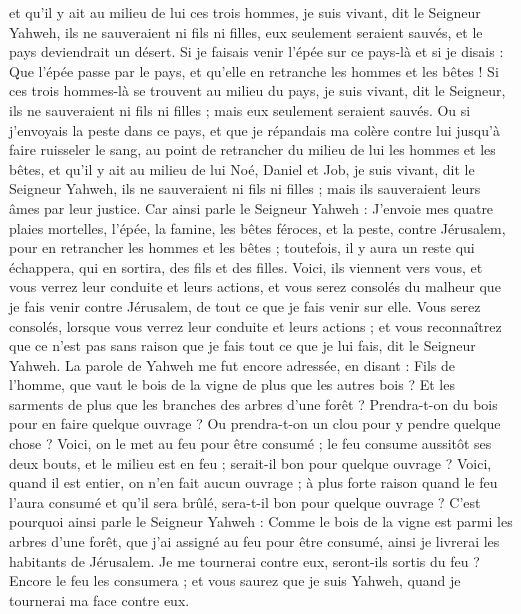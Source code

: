 \begin{multicols}{2}
et qu’il y ait au milieu de lui ces trois hommes, je suis vivant, dit le Seigneur Yahweh, ils ne sauveraient ni fils ni filles, eux seulement seraient sauvés, et le pays deviendrait un désert.
Si je faisais venir l'épée sur ce pays-là et si je disais : Que l'épée passe par le pays, et qu'elle en retranche les hommes et les bêtes !
Si ces trois hommes-là se trouvent au milieu du pays, je suis vivant, dit le Seigneur, ils ne sauveraient ni fils ni filles ; mais eux seulement seraient sauvés.
Ou si j'envoyais la peste dans ce pays, et que je répandais ma colère contre lui jusqu’à faire ruisseler le sang, au point de retrancher du milieu de lui les hommes et les bêtes,
et qu’il y ait au milieu de lui Noé, Daniel et Job, je suis vivant, dit le Seigneur Yahweh, ils ne sauveraient ni fils ni filles ; mais ils sauveraient leurs âmes par leur justice.
Car ainsi parle le Seigneur Yahweh : J'envoie mes quatre plaies mortelles, l'épée, la famine, les bêtes féroces, et la peste, contre Jérusalem, pour en retrancher les hommes et les bêtes ;
toutefois, il y aura un reste qui échappera, qui en sortira, des fils et des filles. Voici, ils viennent vers vous, et vous verrez leur conduite et leurs actions, et vous serez consolés du malheur que je fais venir contre Jérusalem, de tout ce que je fais venir sur elle.
Vous serez consolés, lorsque vous verrez leur conduite et leurs actions ; et vous reconnaîtrez que ce n’est pas sans raison que je fais tout ce que je lui fais, dit le Seigneur Yahweh.
\VerseOne{}La parole de Yahweh me fut encore adressée, en disant :
Fils de l’homme, que vaut le bois de la vigne de plus que les autres bois ? Et les sarments  de plus que les branches des arbres d'une forêt ?
Prendra-t-on du bois pour en faire quelque ouvrage ? Ou prendra-t-on un clou pour y pendre quelque chose ?
Voici, on le met au feu pour être consumé ; le feu consume aussitôt ses deux bouts, et le milieu est en feu ; serait-il bon pour quelque ouvrage ?
Voici, quand il est entier, on n'en fait aucun ouvrage ; à plus forte raison quand le feu l'aura consumé et qu'il sera brûlé, sera-t-il bon pour quelque ouvrage ?
C'est pourquoi ainsi parle le Seigneur Yahweh : Comme le bois de la vigne est parmi les arbres d'une forêt, que j'ai assigné au feu pour être consumé, ainsi je livrerai les habitants de Jérusalem.
Je me tournerai contre eux, seront-ils sortis du feu ? Encore le feu les consumera ; et vous saurez que je suis Yahweh, quand je tournerai ma face contre eux.

\end{multicols}
